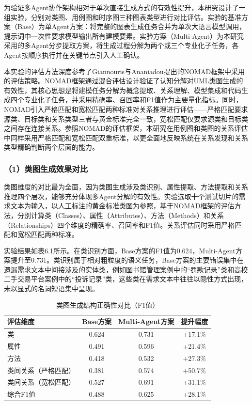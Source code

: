 为验证多Agent协作架构相对于单次直接生成方式的有效性提升，本研究设计了一组实验，分别对类图、用例图和时序图三种图表类型进行对比评估。实验的基准方案（Base）为单Agent方案：将完整的图表生成任务合并为单次大语言模型调用，提示词中一次性要求模型输出所有建模要素。实验方案（Multi-Agent）为本研究采用的多Agent分步提取方案，将生成过程分解为两个或三个专业化子任务，各Agent按顺序执行并在关键节点引入人工确认。

本实验的评估方法深度参考了Giannouris与Ananiadou提出的NOMAD框架\cite{giannouris2025nomad}中采用的评估策略。NOMAD框架通过混合评估设计验证了认知分解对UML类图生成的有效性，其核心思想是将建模任务分解为概念提取、关系理解、模型集成和代码生成四个专业化子任务，并采用精确率、召回率和F1值作为主要量化指标。同时，NOMAD引入严格匹配和宽松匹配两种标准对关系推理进行评估——严格匹配要求源类、目标类和关系类型三者与黄金标准完全一致，宽松匹配仅要求源类和目标类之间存在连接关系。参照NOMAD的评估框架，本研究在用例图和类图的关系评估中同样采用严格匹配和宽松匹配双重标准，以更全面地反映系统在关系发现和关系类型精确判断两个层面的能力。

\subsubsection{（1）类图生成效果对比}

类图维度的对比最为全面，因为类图生成涉及类识别、属性提取、方法提取和关系推理四个层次，能够充分体现多Agent分解的有效性。实验选取十个测试切片的需求文本为输入，以人工标注的黄金标准类图为参照，基于NOMAD框架的评估方法，分别计算类（Classes）、属性（Attributes）、方法（Methods）和关系（Relationships）四个维度的精确率、召回率和F1值。关系评估同时采用严格匹配和宽松匹配两种标准。

实验结果如表6.1所示。在类识别方面，Base方案的F1值为0.624，Multi-Agent方案提升至0.731。类识别属于相对粗粒度的语义任务，Base方案的主要错误集中在遗漏需求文本中间接涉及的实体类，例如图书馆管理案例中的“罚款记录”类和高校二手交易平台案例中的“投诉记录”类，这些类在需求文本中往往以隐性方式出现，未以显式的名词短语集中呈现。

\begin{table}[htbp]
    \centering
    \caption{类图生成结构正确性对比（F1值）}
    \label{tab:class_comparison}
    \begin{tabular}{lccc}
        \toprule
        评估维度 & Base方案 & Multi-Agent方案 & 提升幅度 \\
        \midrule
        类 & 0.624 & 0.731 & +17.1\% \\
        属性 & 0.491 & 0.596 & +21.4\% \\
        方法 & 0.418 & 0.532 & +27.3\% \\
        类间关系（严格匹配） & 0.381 & 0.574 & +50.7\% \\
        类间关系（宽松匹配） & 0.527 & 0.691 & +31.1\% \\
        综合F1值 & 0.488 & 0.625 & +28.1\% \\
        \bottomrule
    \end{tabular}
\end{table}

